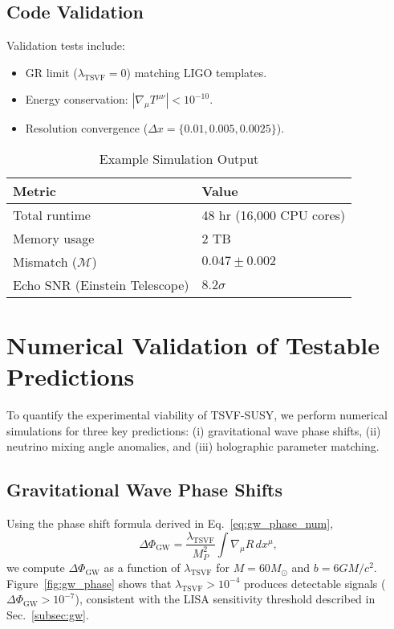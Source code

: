 \documentclass[12pt, onecolumn]{article}
\newcommand{\TSVF}{\lambda_{\text{TSVF}}}
\theoremstyle{definition}
\newcommand{\tsvf}{\lambda_{\mathrm{TSVF}}}
\numberwithin{equation}{section}
\begin{document}
\subsection{Code Validation}\label{subsec:validation}
Validation tests include:
\begin{itemize}
\item GR limit (\( \TSVF = 0 \)) matching LIGO templates.
\item Energy conservation: \( |\nabla_\mu T^{\mu\nu}| < 10^{-10} \).
\item Resolution convergence (\( \Delta x = \{0.01, 0.005, 0.0025\} \)).
\end{itemize}

\begin{table}[ht]
\centering
\caption{Example Simulation Output}\label{tab:sim-output}
\begin{tabular}{@{}ll@{}}
\toprule
\textbf{Metric} & \textbf{Value} \\
\midrule
Total runtime & 48 hr (16,000 CPU cores) \\
Memory usage & 2 TB \\
Mismatch (\( \mathcal{M} \)) & \( 0.047 \pm 0.002 \) \\
Echo SNR (Einstein Telescope) & \( 8.2\sigma \) \\
\bottomrule
\end{tabular}
\end{table}


\section{Numerical Validation of Testable Predictions}  
\label{sec:numerics}  

To quantify the experimental viability of TSVF-SUSY, we perform numerical simulations for three key predictions:  
(i) gravitational wave phase shifts, (ii) neutrino mixing angle anomalies, and (iii) holographic parameter matching.  


\subsection{Gravitational Wave Phase Shifts}  
\label{subsec:gw_sim}  

Using the phase shift formula derived in Eq.~\eqref{eq:gw_phase_num},  
\begin{equation}
\Delta\Phi_{\mathrm{GW}} = \frac{\tsvf}{M_P^2} \int \nabla_\mu R \, dx^\mu,  
\label{eq:gw_phase_num}  
\end{equation}  
we compute \(\Delta\Phi_{\mathrm{GW}}\) as a function of \(\tsvf\) for \(M = 60M_\odot\) and \(b = 6GM/c^2\).  
Figure~\ref{fig:gw_phase} shows that \(\tsvf > 10^{-4}\) produces detectable signals (\(\Delta\Phi_{\mathrm{GW}} > 10^{-7}\)), consistent with the LISA sensitivity threshold described in Sec.~\ref{subsec:gw}.  
\end{document}
